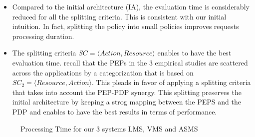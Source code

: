 \begin{itemize} 
\item Compared to the initial architecture (IA), the evaluation time is considerably reduced for all the splitting criteria. This is consistent with our 
initial intuition. In fact, splitting the policy into small policies improves requests processing duration.


\item The splitting criteria \normalsize $SC=\langle Action, Resource\rangle$ enables to have the best evaluation time. 
recall that the PEPs in the 3 empirical studies are scattered across the applications by a categorization 
that is based on $SC_{2}=\langle Resource,Action\rangle$. This pleads in favor of applying a splitting criteria 
that takes into account the PEP-PDP synergy. This splitting preserves the initial architecture by keeping a strog mapping between the PEPS and the PDP and enables 
to have the best results in terms of performance.

\end{itemize} 
\begin{figure}
  \centering
  \caption{Processing Time for our 3 systems LMS, VMS and ASMS}
  \label{fig:processing time}
\end{figure}
